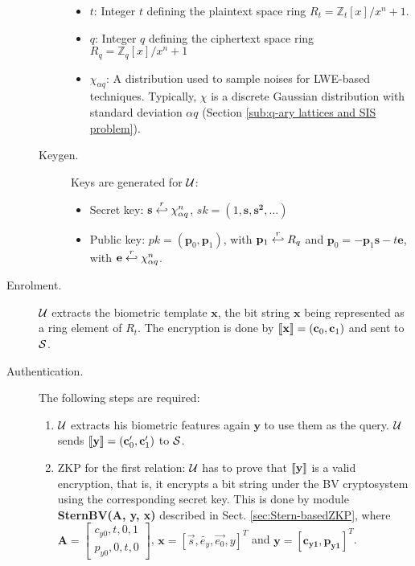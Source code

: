 \begin{description}
\begin{description}
\begin{itemize}
    \item $t$: Integer $t$ defining the plaintext space ring $R_t = \mathbb{Z}_t[x]/x^n+1$.
    \item $q$: Integer $q$ defining the ciphertext space ring $R_q = \mathbb{Z}_q[x]/x^n+1$
    \item $\chi_{\alpha q}$: A distribution used to sample noises for LWE-based techniques.  Typically, $\chi$
      is a discrete Gaussian distribution with standard deviation $\alpha q$ (Section \ref{sub:q-ary lattices and SIS problem}).
    \end{itemize}
  \item[Keygen.] Keys are generated for $\mathcal{U}$:
    \begin{itemize}
    \item Secret key: $\mathbf{s} \stackrel{r}{\hookleftarrow} \chi_{\alpha q}^n$, \(sk = (1, \mathbf{s, s^{2}, ...})\)
    \item Public key: $pk = (\mathbf{p}_0,\mathbf{p}_1)$, with $\mathbf{p}_1 \stackrel{r}{\hookleftarrow} R_q$ and
      $\mathbf{p}_0 = -\mathbf{p}_1\mathbf{s} - t\mathbf{e}$, with $\mathbf{e} \stackrel{r}{\hookleftarrow} \chi_{\alpha q}^n$.
    \end{itemize}
  \end{description}
\item [Enrolment.] $\mathcal{U}$ extracts the biometric template $\mathbf{x}$, the bit string $\mathbf{x}$ being
  represented as a ring element of ${R}_t$.  The encryption is done by $\left\llbracket\mathbf{x}\right\rrbracket = (\mathbf{c}_0,\mathbf{c}_1)$
  and sent to $\mathcal{S}$.
\item [Authentication.] The following steps are required:
  \begin{enumerate}
  \item $\mathcal{U}$ extracts his biometric features again $\mathbf{y}$ to use them as the query. $\mathcal{U}$ sends
    $\left\llbracket\mathbf{y}\right\rrbracket = (\mathbf{c}_0', \mathbf{c}_1')$ to $\mathcal{S}$.
  \item ZKP for the first relation: $\mathcal{U}$ has to prove that $\left\llbracket\mathbf{y}\right\rrbracket$ is a valid encryption, that is, it
    encrypts a bit string under the BV cryptosystem using the corresponding secret key. This is done by module
    \textbf{SternBV(A, y, x)} described in Sect. \ref{sec:Stern-basedZKP}, where
    $\mathbf{A} = \begin{bmatrix} c_{y0}, t, 0, 1\\p_{y0}, 0, t, 0
    \end{bmatrix}$, \(\mathbf{x} = [\vec{s},\tilde{e_{y}},\vec{e_{0}},y]^T\) and \(\mathbf{y
    = [c_{y1},p_{y1}]}^{T}\).


\end{enumerate}
\end{description}
